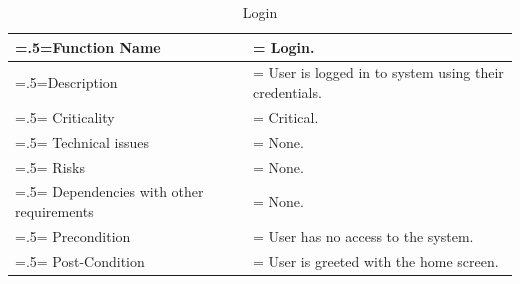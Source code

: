 \documentclass[12pt]{article}
\begin{document}
\begin{center}
    \begin{table}[H]
        \caption{Login}
        \begin{tabularx}{\textwidth} {
                | >{\raggedright\arraybackslash\hsize=.5\hsize\linewidth=\hsize}X
                | >{\raggedright\arraybackslash\hsize=1.5\hsize\linewidth=\hsize}X |}
            \hline
            Function Name                        & Login.                                               \\ \hline
            Description                          & User is logged in to system using their credentials. \\ \hline
            Criticality                          & Critical.                                            \\ \hline
            Technical issues                     & None.                                                \\ \hline
            Risks                                & None.                                                \\ \hline
            Dependencies with other requirements & None.                                                \\ \hline
            Precondition                         & User has no access to the system.                    \\ \hline
            Post-Condition                       & User is greeted with the home screen.                \\ \hline
        \end{tabularx}
    \end{table}
\end{center}
\end{document}
